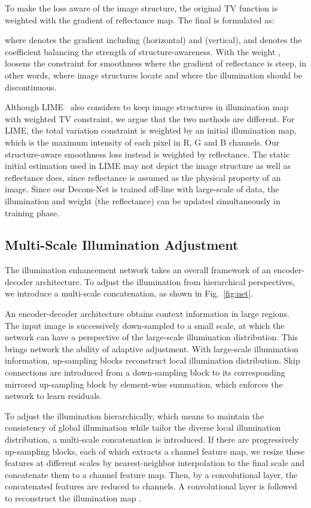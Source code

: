 \documentclass{bmvc2k}
\begin{document}
 To make the loss aware of the image structure, the original TV function is weighted with the gradient of reflectance map. The final  is formulated as:

where  denotes the gradient including  (horizontal) and  (vertical), and  denotes the coefficient balancing the strength of structure-awareness. With the weight ,  loosens the constraint for smoothness where the gradient of reflectance is steep, in other words, where image structures locate and where the illumination should be discontinuous.

Although LIME~\cite{Guo2017LIME} also considers to keep image structures in illumination map with weighted TV constraint, we argue that the two methods are different. For LIME, the total variation constraint is weighted by an initial illumination map, which is the maximum intensity of each pixel in R, G and B channels. Our structure-aware smoothness loss instead is weighted by reflectance. The static initial estimation used in LIME may not depict the image structure as well as reflectance does, since reflectance is assumed as the physical property of an image. Since our Decom-Net is trained off-line with large-scale of data, the illumination and weight (the reflectance) can be updated simultaneously in training phase.

\subsection{Multi-Scale Illumination Adjustment}
The illumination enhancement network takes an overall framework of an encoder-decoder architecture. To adjust the illumination from hierarchical perspectives, we introduce a multi-scale concatenation, as shown in Fig.~\ref{fig:net}.

An encoder-decoder architecture obtains context information in large regions. The input image is successively down-sampled to a small scale, at which the network can have a perspective of the large-scale illumination distribution. This brings network the ability of adaptive adjustment. With large-scale illumination information, up-sampling blocks reconstruct local illumination distribution. Skip connections are introduced from a down-sampling block to its corresponding mirrored up-sampling block by element-wise summation, which enforces the network to learn residuals.

To adjust the illumination hierarchically, which means to maintain the consistency of global illumination while tailor the diverse local illumination distribution, a multi-scale concatenation is introduced. If there are  progressively up-sampling blocks, each of which extracts a  channel feature map, we resize these features at different scales by nearest-neighbor interpolation to the final scale and concatenate them to a  channel feature map. Then, by a  convolutional layer, the concatenated features are reduced to  channels. A  convolutional layer is followed to reconstruct the illumination map .
\end{document}
